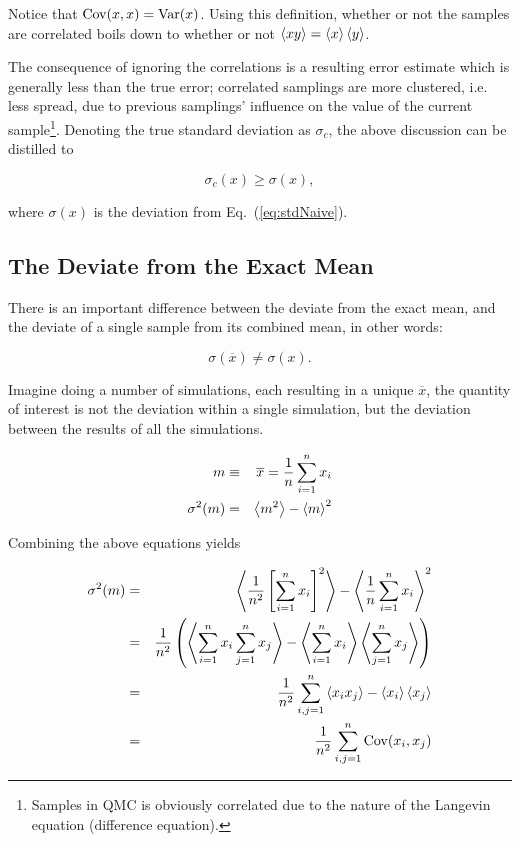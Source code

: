Notice that $\mathrm{Cov}(x,x) = \mathrm{Var}(x)$. Using this definition, whether or not the samples are correlated boils down to whether or not $\left< xy \right> = \left< x \right>\left< y \right>$. 

The consequence of ignoring the correlations is a resulting error estimate which is generally less than the true error; correlated samplings are more clustered, i.e. less spread, due to previous samplings' influence on the value of the current sample\footnote{Samples in QMC is obviously correlated due to the nature of the Langevin equation (difference equation).}. Denoting the true standard deviation as $\sigma_c$, the above discussion can be distilled to

\begin{equation}
 \label{eq:trueVsNaiveSTD}
 \sigma_c(x) \ge \sigma(x),
\end{equation}

where $\sigma(x)$ is the deviation from Eq.~(\ref{eq:stdNaive}). 


\subsection{The Deviate from the Exact Mean}

There is an important difference between the deviate from the exact mean, and the deviate of a single sample from its combined mean, in other words:

\begin{equation}
 \sigma(\overline{x}) \ne \sigma(x).
\end{equation}

Imagine doing a number of simulations, each resulting in a unique $\overline{x}$, the quantity of interest is not the deviation within a single simulation, but the deviation between the results of all the simulations.

\begin{eqnarray}
 m &\equiv& \overline{x} = \frac{1}{n}\sum_{i=1}^n x_i \label{eq:meanx}\\
 \sigma^2(m) &=& \left< m^2 \right> - \left< m \right>^2 \label{eq:sigma_m}
\end{eqnarray}

Combining the above equations yields

\begin{eqnarray}
\label{eq:realErrorCovariance1}
  \sigma^2(m) &=& \left< \frac{1}{n^2}\left[\sum_{i=1}^nx_i\right]^2 \right> - \left< \frac{1}{n}\sum_{i=1}^n x_i \right>^2 \nonumber\\
              &=& \frac{1}{n^2}\left( \left< \sum_{i=1}^n x_i\sum_{j=1}^n x_j \right> - \left< \sum_{i=1}^n x_i \right>\left< \sum_{j=1}^n x_j \right>  \right) \nonumber\\
              &=& \frac{1}{n^2}\sum_{i,j=1}^n \left< x_ix_j \right> - \left< x_i \right>\left< x_j \right> \nonumber\\
              &=& \frac{1}{n^2}\sum_{i,j=1}^n \mathrm{Cov}(x_i, x_j)
\end{eqnarray}

